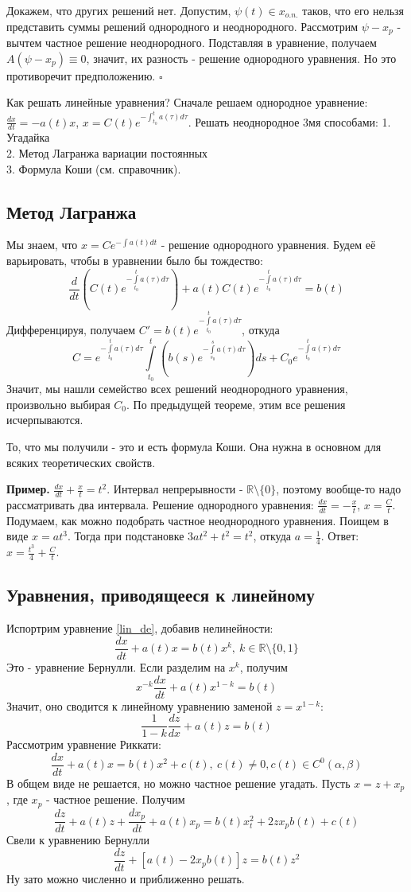 Докажем, что других решений нет. Допустим, $\psi(t)\in x_{o.n.}$ таков, что
его нельзя представить суммы решений однородного и неоднородного. Рассмотрим
$\psi-x_p$ - вычтем частное решение неоднородного. Подставляя в уравнение, 
получаем  $A(\psi-x_p)\equiv 0$, значит, их разность - решение однородного
уравнения. Но это противоречит предположению. $\square$

Как решать линейные уравнения? Сначале решаем однородное уравнение:
$\frac{dx}{dt}=-a(t)x$, $x=C(t)e^{-\int_{t_0}^{t} a(\tau)d\tau}$. 
Решать неоднородное 3мя способами:
1. Угадайка\\
2. Метод Лагранжа вариации постоянных\\
3. Формула Коши (см. справочник).
\subsection{Метод Лагранжа}
Мы знаем, что $x=Ce^{-\int a(t)dt}$ - решение однородного уравнения. 
Будем её варьировать, чтобы в уравнении было бы тождество:
$$\frac{d}{dt}\left( C(t)e^{-\int\limits_{t_0}^{t}a(\tau)d\tau} \right)+
a(t)C(t)e^{-\int\limits_{t_0}^{t}a(\tau)d\tau}=b(t)$$
Дифференцируя, получаем $C'=b(t)e^{-\int\limits_{t_0}^{t}a(\tau)d\tau}$, 
откуда  $$C=e^{-\int\limits_{t_0}^{t}a(\tau)d\tau}\int\limits_{t_0}^{t}\left( 
b(s)e^{-\int\limits_{s_0}^{s}a(\tau)d\tau} \right)ds+
C_0e^{-\int\limits_{t_0}^{t}a(\tau)d\tau}$$ 
Значит, мы нашли семейство всех решений неоднородного уравнения, произвольно
выбирая $C_0$. По предыдущей теореме, этим все решения исчерпываются. 

То, что мы получили - это и есть формула Коши. Она нужна в основном для
всяких теоретических свойств.

\textbf{Пример.} $\frac{dx}{dt}+\frac{x}{t}=t^2$.
Интервал непрерывности - $\mathbb{R}\setminus \{0\}$, поэтому вообще-то
надо рассматривать два интервала. Решение однородного уравнения:
$\frac{dx}{dt}=-\frac{x}{t}$, $x=\frac{C}{t}$. Подумаем, как можно подобрать
частное неоднородного уравнения. Поищем в виде $x=at^3$. Тогда при подстановке
$3at^2+t^2=t^2$, откуда $a=\frac{1}{4}$. Ответ: $x=\frac{t^3}{4}+\frac{C}{t}$.

\subsection{Уравнения, приводящееся к линейному}
Испортрим уравнение \ref{lin_de}, добавив нелинейности:
$$\frac{dx}{dt}+a(t)x=b(t)x^k,~k\in \mathbb{R}\setminus\{0,1\}$$ 
Это - уравнение Бернулли. Если разделим на $x^k$, получим
$$x^{-k} \frac{dx}{dt}+a(t)x^{1-k}=b(t)$$ 
Значит, оно сводится к линейному уравнению заменой $z=x^{1-k}$:
 $$\frac{1}{1-k} \frac{dz}{dx}+a(t)z=b(t)$$ 
Рассмотрим уравнение Риккати:
$$\frac{dx}{dt}+a(t)x=b(t)x^2+c(t),~c(t)\ne 0,c(t)\in C^0(\alpha,\beta)$$ 
В общем виде не решается, но можно частное решение угадать. 
Пусть $x=z+x_p$, где  $x_p$ - частное решение. Получим
$$\frac{dz}{dt}+a(t)z+\frac{dx_p}{dt}+a(t)x_p=b(t)x^2_t+2zx_pb(t)+c(t)$$
Свели к уравнению Бернулли
$$\frac{dz}{dt}+[a(t)-2x_pb(t)]z=b(t)z^2$$ 
Ну зато можно численно и приближенно решать. 

